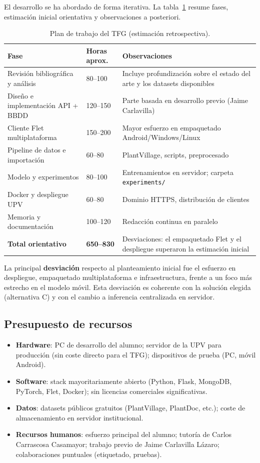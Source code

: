 \documentclass[11pt,spanish,listoffigures,listoftables]{tfgetsinf}
\begin{document}
El desarrollo se ha abordado de forma iterativa. La tabla~\ref{tab:plan-trabajo} resume fases, estimación inicial orientativa y observaciones a posteriori.

\begin{table}[htbp]
\centering
\caption{Plan de trabajo del TFG (estimación retrospectiva).}
\label{tab:plan-trabajo}
\small
\begin{tabular}{p{4cm}p{2cm}p{6.5cm}}
\hline
\textbf{Fase} & \textbf{Horas aprox.} & \textbf{Observaciones} \\
\hline
Revisión bibliográfica y análisis & 80--100 & Incluye profundización sobre el estado del arte y los datasets disponibles \\
Diseño e implementación API + BBDD & 120--150 & Parte basada en desarrollo previo (Jaime Carlavilla) \\
Cliente Flet multiplataforma & 150--200 & Mayor esfuerzo en empaquetado Android/Windows/Linux \\
Pipeline de datos e importación & 60--80 & PlantVillage, scripts, preprocesado \\
Modelo y experimentos & 80--100 & Entrenamientos en servidor; carpeta \texttt{experiments/} \\
Docker y despliegue UPV & 60--80 & Dominio HTTPS, distribución de clientes \\
Memoria y documentación & 100--120 & Redacción continua en paralelo \\
\hline
\textbf{Total orientativo} & \textbf{650--830} & Desviaciones: el empaquetado Flet y el despliegue superaron la estimación inicial \\
\hline
\end{tabular}
\end{table}

La principal \textbf{desviación} respecto al planteamiento inicial fue el esfuerzo en despliegue, empaquetado multiplataforma e infraestructura, frente a un foco más estrecho en el modelo móvil. Esta desviación es coherente con la solución elegida (alternativa C) y con el cambio a inferencia centralizada en servidor.

\subsection{Presupuesto de recursos}

\begin{itemize}
    \item \textbf{Hardware}: PC de desarrollo del alumno; servidor de la UPV para producción (sin coste directo para el TFG); dispositivos de prueba (PC, móvil Android).
    \item \textbf{Software}: stack mayoritariamente abierto (Python, Flask, MongoDB, PyTorch, Flet, Docker); sin licencias comerciales significativas.
    \item \textbf{Datos}: datasets públicos gratuitos (PlantVillage, PlantDoc, etc.); coste de almacenamiento en servidor institucional.
    \item \textbf{Recursos humanos}: esfuerzo principal del alumno; tutoría de Carlos Carrascosa Casamayor; trabajo previo de Jaime Carlavilla Lázaro; colaboraciones puntuales (etiquetado, pruebas).
\end{itemize}
\end{document}
